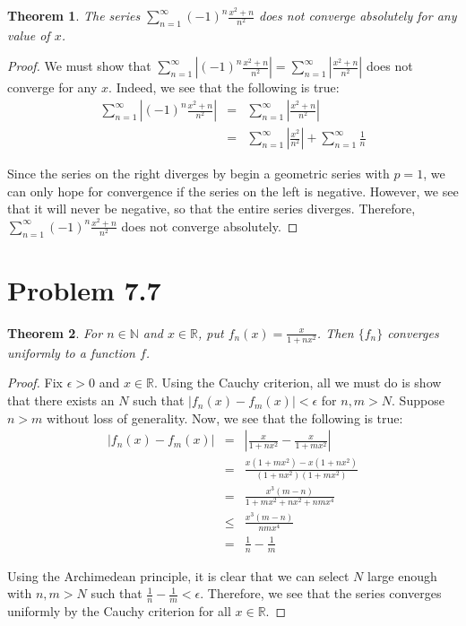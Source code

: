 \documentclass[psamsfonts]{amsart}
\newtheorem{thm}{Theorem}[section]
\theoremstyle{definition}
\theoremstyle{remark}
\numberwithin{equation}{section}
\begin{document}
\begin{thm}
The series  $\sum_{n=1}^\infty (-1)^n \frac{x^2 + n}{n^2}$ does not converge absolutely for any value of $x$. 
\end{thm}

\begin{proof}
We must show that $\sum_{n=1}^\infty \left| (-1)^n \frac{x^2 + n}{n^2} \right| = \sum_{n=1}^\infty \left| \frac{x^2+n}{n^2} \right|$ does not converge for any $x$. Indeed, we see that the following is true:
\begin{eqnarray}
\sum_{n=1}^\infty \left| (-1)^n \frac{x^2 + n}{n^2} \right| &=& \sum_{n=1}^\infty \left| \frac{x^2+n}{n^2} \right| \\
 &=& \sum_{n=1}^\infty \left| \frac{x^2}{n^2} \right| + \sum_{n=1}^\infty \frac{1}{n} 
\end{eqnarray}

Since the series on the right diverges by begin a geometric series with $p=1$, we can only hope for convergence if the series on the left is negative. However, we see that it will never be negative, so that the entire series diverges. Therefore, $\sum_{n=1}^\infty (-1)^n \frac{x^2 + n}{n^2}$ does not converge absolutely. 
\end{proof}

\section{Problem 7.7}

\begin{thm}
For $n \in \mathbb{N}$ and $x \in \mathbb{R}$, put $f_n(x) = \frac{x}{1+nx^2}$. Then $\{f_n\}$ converges uniformly to a function $f$. 
\end{thm}

\begin{proof}
Fix $\epsilon > 0$ and $x \in \mathbb{R}$. Using the Cauchy criterion, all we must do is show that there exists an $N$ such that $|f_n(x) - f_m(x)| < \epsilon$ for $n,m > N$. Suppose $n > m$ without loss of generality. Now, we see that the following is true:
\begin{eqnarray}
\left| f_n(x) - f_m(x) \right| &=& \left| \frac{x}{1+nx^2} - \frac{x}{1+mx^2} \right| \\
&=& \frac{x(1+mx^2) - x(1 + nx^2)}{(1+nx^2)(1+mx^2)} \\
&=& \frac{x^3(m-n)}{1 +m x^2 + nx^2 + nm x^4} \\
&\leq& \frac{x^3(m-n)}{nmx^4} \\
&=& \frac{1}{n} - \frac{1}{m} 
\end{eqnarray}

Using the Archimedean principle, it is clear that we can select $N$ large enough with $n,m > N$ such that $\frac{1}{n} - \frac{1}{m} < \epsilon$. Therefore, we see that the series converges uniformly by the Cauchy criterion for all $x \in \mathbb{R}$.
\end{proof}
\end{document}

